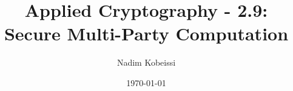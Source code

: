 \documentclass[aspectratio=169, lualatex, handout]{beamer}
\title{Applied Cryptography - 2.9: Secure Multi-Party Computation}
\author{Nadim Kobeissi}
\institute{American University of Beirut}
\date{\today}
\begin{document}
\begin{frame}[plain]
	\titlepage
\end{frame}

\incompleteslideswarning

\begin{frame}[plain]
	\titlepage
\end{frame}
\end{document}
